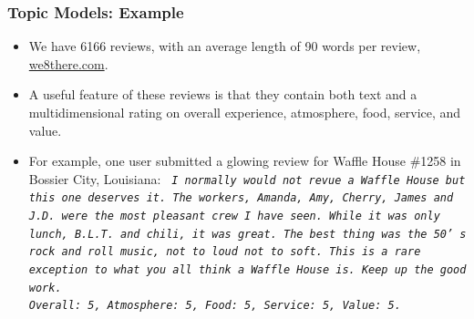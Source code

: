 \documentclass[
  shownotes,
  xcolor={svgnames},
  hyperref={colorlinks,citecolor=DarkBlue,linkcolor=DarkRed,urlcolor=DarkBlue}
  , aspectratio=169]{beamer}
\begin{document}
\begin{frame}
\frametitle{Topic Models: Example}

\begin{itemize}


\item We have 6166 reviews, with an average length of 90 words per review, \url{we8there.com}. 
\medskip
\item A useful feature of these reviews is that they contain both text and a multidimensional rating on overall experience, atmosphere, food, service, and value. 
\medskip
\item For example, one user submitted a glowing review for Waffle House \#1258 in Bossier City, Louisiana: 
\medskip
{\tt \it 
I normally would not revue a Waffle House but this one deserves it. The workers, Amanda, Amy, Cherry, James and J.D. were the most pleasant crew I have seen. While it was only lunch, B.L.T. and chili, it was great. The best thing was the 50’ s rock and roll music, not to loud not to soft. This is a rare exception to what you all think a Waffle House is. Keep up the good work. \\
Overall: 5, Atmosphere: 5, Food: 5, Service: 5, Value: 5. 
}
\end{itemize}
\end{frame}
\end{document}
